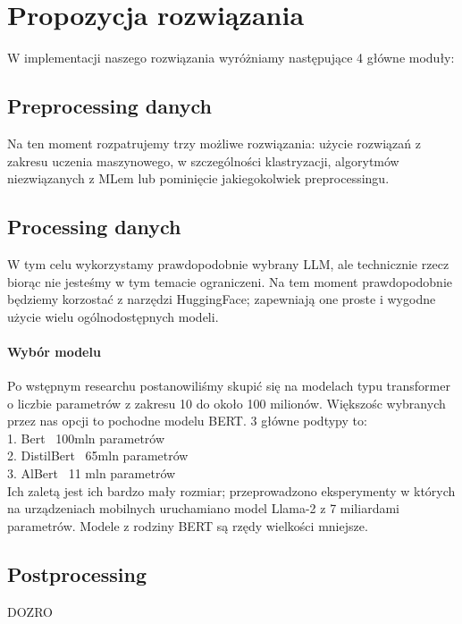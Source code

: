 \documentclass[12pt]{article}
\begin{document}
\section*{Propozycja rozwiązania}
W implementacji naszego rozwiązania wyróżniamy następujące 4 główne moduły: \\
\subsection*{Preprocessing danych}
Na ten moment rozpatrujemy trzy możliwe rozwiązania: użycie rozwiązań z zakresu uczenia maszynowego, w szczególności klastryzacji, algorytmów niezwiązanych z MLem lub pominięcie jakiegokolwiek preprocessingu. \\
\subsection*{Processing danych}
W tym celu wykorzystamy prawdopodobnie wybrany LLM, ale technicznie rzecz biorąc nie jesteśmy w tym temacie ograniczeni. Na tem moment prawdopodobnie będziemy korzostać z narzędzi HuggingFace; zapewniają one proste i wygodne użycie wielu ogólnodostępnych modeli. \\
\paragraph{Wybór modelu}
Po wstępnym researchu postanowiliśmy skupić się na modelach typu transformer o liczbie parametrów z zakresu 10 do około 100 milionów. Większośc wybranych przez nas opcji to pochodne modelu BERT\cite{devlin2019bertpretrainingdeepbidirectional}. 3 główne podtypy to: \\
1. Bert ~100mln parametrów \\
2. DistilBert ~65mln parametrów \\
3. AlBert ~11 mln parametrów \\
Ich zaletą jest ich bardzo mały rozmiar; przeprowadzono eksperymenty\cite{LLMmobile2024} w których na urządzeniach mobilnych uruchamiano model Llama-2 z 7 miliardami parametrów. Modele z rodziny BERT są rzędy wielkości mniejsze.
\subsection*{Postprocessing}
DOZRO \\
\end{document}
